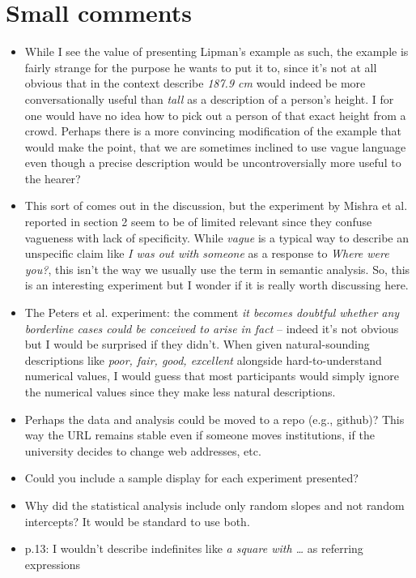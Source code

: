 \documentclass[10pt,a4paper]{article}
\begin{document}
\section*{Small comments}
\begin{itemize}
\item
While I see the value of presenting Lipman's example as such, the example is fairly strange for the purpose he wants to put it to, since it's not at all obvious that in the context describe \emph{187.9 cm} would indeed be more conversationally useful than \emph{tall} as a description of a person's height. I for one would have no idea how to pick out a person of that exact height from a crowd. Perhaps there is a more convincing modification of the example that would make the point, that we are sometimes inclined to use vague language even though a precise description would be uncontroversially more useful to the hearer?
\item
This sort of comes out in the discussion, but the experiment by Mishra et al. reported in section 2 seem to be of limited relevant since they confuse vagueness with lack of specificity. While \emph{vague} is a typical way to describe an unspecific claim like \emph{I was out with someone} as a response to \emph{Where were you?}, this isn't the way we usually use the term in semantic analysis. So, this is an interesting experiment but I wonder if it is really worth discussing here.
\item
The Peters et al. experiment: the comment \emph{it becomes doubtful whether any borderline cases could be conceived to arise in fact} – indeed it's not obvious but I would be surprised if they didn't. When given natural-sounding descriptions like \emph{poor, fair, good, excellent} alongside hard-to-understand numerical values, I would guess that most participants would simply ignore the numerical values since they make less natural descriptions.
\item
Perhaps the data and analysis could be moved to a repo (e.g., github)? This way the URL remains stable even if someone moves institutions, if the university decides to change web addresses, etc. 
\item
Could you include a sample display for each experiment presented?
\item
Why did the statistical analysis include only random slopes and not random intercepts? It would be standard to use both.
\item
p.13: I wouldn't describe indefinites like \emph{a square with \ldots} as referring expressions

\end{itemize}
\end{document}

